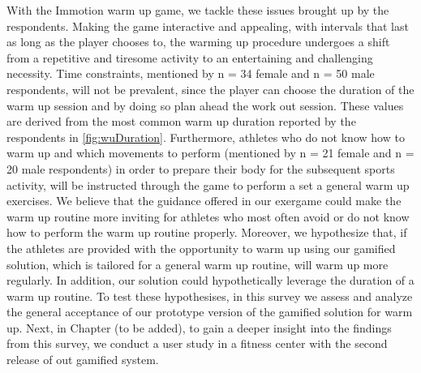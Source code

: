 With the Immotion warm up game, we tackle these issues brought up by the respondents. Making the game interactive and appealing, with intervals that last as long as the player chooses to, the warming up procedure undergoes a shift from a repetitive and tiresome activity to an entertaining and challenging necessity. Time constraints, mentioned by n = 34 female and n = 50 male respondents, will not be prevalent, since the player can choose the duration of the warm up session and by doing so plan ahead the work out session. These values are derived from the most common warm up duration reported by the respondents in \ref{fig:wuDuration}. Furthermore, athletes who do not know how to warm up and which movements to perform (mentioned by n = 21 female and n = 20 male respondents) in order to prepare their body for the subsequent sports activity, will be instructed through the game to perform a set a general warm up exercises. We believe that the guidance offered in our exergame could make the warm up routine more inviting for athletes who most often avoid or do not know how to perform the warm up routine properly. Moreover, we hypothesize that, if the athletes are provided with the opportunity to warm up using our gamified solution, which is tailored for a general warm up routine, will warm up more regularly. In addition, our solution could hypothetically leverage the duration of a warm up routine. To test these hypothesises, in this survey we assess and analyze the general acceptance of our prototype version of the gamified solution for warm up. Next, in Chapter (to be added), to gain a deeper insight into the findings from this survey, we conduct a user study in a fitness center with the second release of out gamified system.
